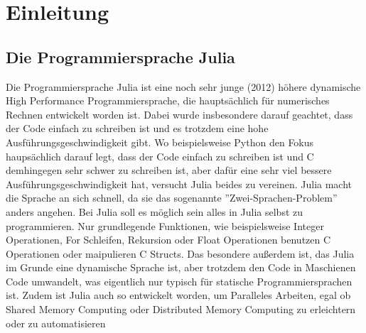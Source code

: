 \documentclass[a4paper, 11pt]{article}
\begin{document}
    \tableofcontents

    \newpage

    \section{Einleitung}
        \subsection{Die Programmiersprache Julia}
        Die Programmiersprache Julia ist eine noch sehr junge (2012) h\"{o}here dynamische High Performance Programmiersprache, die haupts\"{a}chlich f\"{u}r numerisches Rechnen entwickelt worden ist. Dabei wurde insbesondere darauf geachtet, dass der Code einfach zu schreiben ist und es trotzdem eine hohe Ausf\"{u}hrungsgeschwindigkeit gibt. Wo beispielsweise Python den Fokus haups\"{a}chlich darauf legt, dass der Code einfach zu schreiben ist und C demhingegen sehr schwer zu schreiben ist, aber daf\"{u}r eine sehr viel bessere Ausf\"{u}hrungsgeschwindigkeit hat, versucht Julia beides zu vereinen.
         \newline Julia macht die Sprache an sich schnell, da sie das sogenannte  ''Zwei-Sprachen-Problem'' anders angehen. Bei Julia soll es m\"{o}glich sein alles in Julia selbst zu programmieren. Nur grundlegende Funktionen, wie beispielsweise Integer Operationen, For Schleifen, Rekursion oder Float Operationen benutzen C Operationen oder maipulieren C Structs. Das besondere au{\ss}erdem ist, das Julia im Grunde eine dynamische Sprache ist, aber trotzdem den Code in Maschienen Code umwandelt, was eigentlich nur typisch f\"{u}r statische Programmiersprachen ist.  
         \newline Zudem ist Julia auch so entwickelt worden, um Paralleles Arbeiten, egal ob Shared Memory Computing oder Distributed Memory Computing zu erleichtern oder zu automatisieren
         
\end{document}
